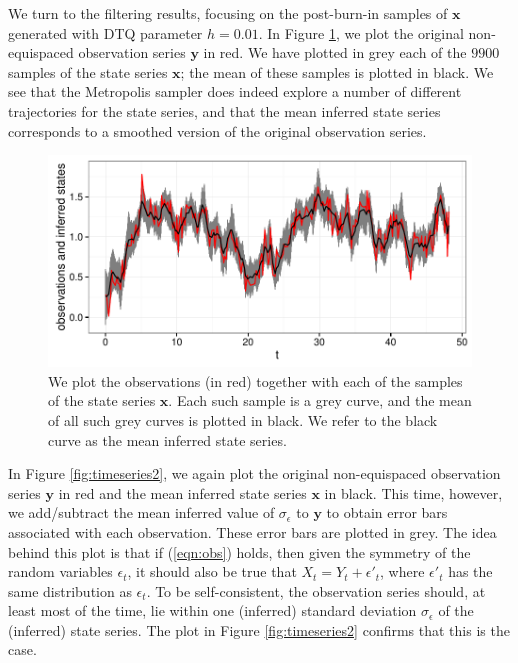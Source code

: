 \documentclass[wcp]{jmlr}
\begin{document}
We turn to the filtering results, focusing on the post-burn-in samples of
$\mathbf{x}$ generated with DTQ parameter $h=0.01$.  In Figure
\ref{fig:timeseries1}, we plot the original non-equispaced observation
series $\mathbf{y}$ in red.  We have plotted in grey each of the
$9900$ samples of the state series $\mathbf{x}$; the mean of these
samples is plotted in black.  We see that the Metropolis sampler does
indeed explore a number of different trajectories for the state
series, and that the mean inferred state series corresponds to a
smoothed version of the original observation series.


\begin{figure}[th]
\begin{center}
\includegraphics[width=6in]{timeseries1}
\end{center}
\vspace{-0.375in}
\caption{We plot the observations (in red) together with each of the
  samples of the state series $\mathbf{x}$.  Each such sample is a
  grey curve, and the mean of all such grey curves is plotted in
  black.  We refer to the black curve as the mean inferred state series.}
\label{fig:timeseries1}
\end{figure}


In Figure \ref{fig:timeseries2}, we again plot the original
non-equispaced observation series $\mathbf{y}$ in red and the mean
inferred state series $\mathbf{x}$ in black.  This time,
however, we add/subtract the mean inferred value of $\sigma_\epsilon$
to $\mathbf{y}$ to obtain error bars associated with each
observation.  These error bars are plotted in grey.  The idea behind
this plot is that if (\ref{eqn:obs}) holds, then given the symmetry of
the random variables $\epsilon_t$, it should also be true that $X_t =
Y_t + \epsilon'_t$, where $\epsilon'_t$ has the same distribution as
$\epsilon_t$.  To be self-consistent, the observation series should,
at least most of the time, lie within one (inferred) standard deviation
$\sigma_\epsilon$ of the (inferred) state series.  The plot in Figure
\ref{fig:timeseries2} confirms that this is the case.
\end{document}
